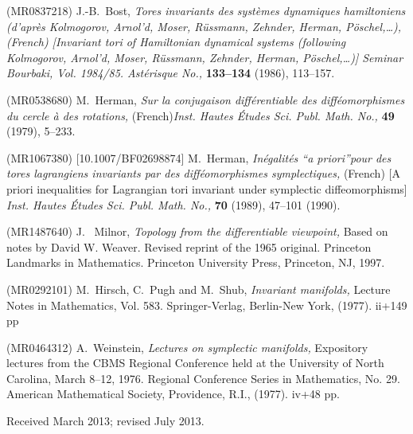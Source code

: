 \documentclass{dcds}
\theoremstyle{definition}
\begin{document}
\begin{thebibliography}{99}
 (MR0837218)
\newblock J.-B.~Bost,
\newblock \emph{\emph{Tores invariants des syst\`emes dynamiques hamiltoniens (d'apr\`es Kolmogorov, Arnol'd, Moser, R\"ussmann, Zehnder, Herman, P\"oschel,\dots),}}
\newblock \emph{(French) [Invariant tori of Hamiltonian dynamical systems (following Kolmogorov, Arnol'd, Moser, R\"ussmann, Zehnder, Herman, P\"oschel,\dots)] Seminar Bourbaki, Vol. 1984/85. Ast\'erisque No.,} \textbf{133--134} (1986), 113--157.

 (MR0538680)
\newblock M.~Herman,
\newblock \emph{\emph{Sur la conjugaison diff\'erentiable des diff\'eomorphismes du cercle \`a des rotations,}}
\newblock  (French)\emph{Inst. Hautes \'Etudes Sci. Publ. Math. No.,} \textbf{49} (1979), 5--233.

 (MR1067380) [10.1007/BF02698874]
\newblock M.~Herman,
\newblock \emph{\emph{In\'egalit\'es ``a priori''pour des tores lagrangiens invariants par des diff\'eomorphismes symplectiques,}}
\newblock (French) [A priori inequalities for Lagrangian tori invariant under symplectic diffeomorphisms] \emph{Inst. Hautes \'Etudes Sci. Publ. Math. No.,} \textbf{70} (1989), 47--101 (1990).

 (MR1487640)
\newblock J.~ Milnor,
\newblock \emph{Topology from the differentiable viewpoint,}
\newblock Based on notes by David W. Weaver. Revised reprint of the 1965 original. Princeton Landmarks in Mathematics. Princeton University Press, Princeton, NJ, 1997.

 (MR0292101)
\newblock M.~Hirsch, C.~Pugh and M.~Shub,
\newblock \emph{ Invariant manifolds,}
\newblock Lecture Notes in Mathematics, Vol. 583. Springer-Verlag, Berlin-New York, (1977). ii+149 pp

 (MR0464312)
\newblock A.~Weinstein,
\newblock \emph{Lectures on symplectic manifolds,}
\newblock Expository lectures from the CBMS Regional Conference held at the University of North Carolina, March 8--12, 1976. Regional Conference Series in Mathematics, No. 29. American Mathematical Society, Providence, R.I., (1977). iv+48 pp.

\end{thebibliography}

\medskip
Received March 2013; revised July 2013.
\medskip
\end{document}
